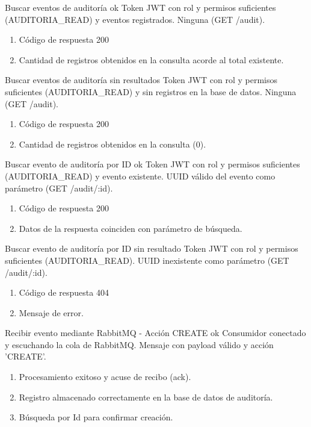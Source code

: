 {Buscar eventos de auditoría ok}
{Token JWT con rol y permisos suficientes (AUDITORIA\_READ) y eventos registrados.}
{Ninguna (GET /audit).}
{\begin{enumerate} [leftmargin=*, nosep]
    \item Código de respuesta 200
    \item Cantidad de registros obtenidos en la consulta acorde al total existente.
\end{enumerate}}

{Buscar eventos de auditoría sin resultados}
{Token JWT con rol y permisos suficientes (AUDITORIA\_READ) y sin registros en la base de datos.}
{Ninguna (GET /audit).}
{\begin{enumerate} [leftmargin=*, nosep]
    \item Código de respuesta 200
    \item Cantidad de registros obtenidos en la consulta (0).
\end{enumerate}}

{Buscar evento de auditoría por ID ok}
{Token JWT con rol y permisos suficientes (AUDITORIA\_READ) y evento existente.}
{UUID válido del evento como parámetro (GET /audit/:id).}
{\begin{enumerate} [leftmargin=*, nosep]
    \item Código de respuesta 200
    \item Datos de la respuesta coinciden con parámetro de búsqueda.
\end{enumerate}}

{Buscar evento de auditoría por ID sin resultado}
{Token JWT con rol y permisos suficientes (AUDITORIA\_READ).}
{UUID inexistente como parámetro (GET /audit/:id).}
{\begin{enumerate} [leftmargin=*, nosep]
    \item Código de respuesta 404
    \item Mensaje de error.
\end{enumerate}}

{Recibir evento mediante RabbitMQ - Acción CREATE ok}
{Consumidor conectado y escuchando la cola de RabbitMQ.}
{Mensaje con payload válido y acción 'CREATE'.}
{\begin{enumerate} [leftmargin=*, nosep]
    \item Procesamiento exitoso y acuse de recibo (ack).
    \item Registro almacenado correctamente en la base de datos de auditoría.
    \item Búsqueda por Id para confirmar creación.
\end{enumerate}}

